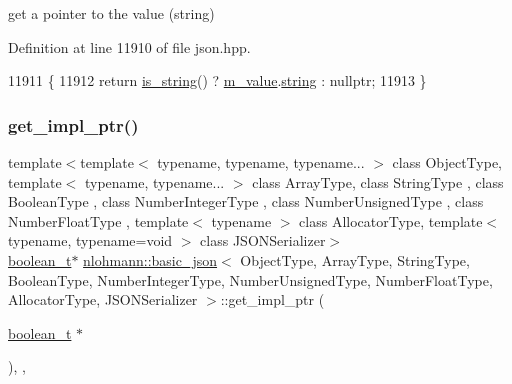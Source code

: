 get a pointer to the value (string) 



Definition at line 11910 of file json.\+hpp.


\begin{DoxyCode}
11911     \{
11912         \textcolor{keywordflow}{return} \hyperlink{classnlohmann_1_1basic__json_a69b596a4a6683b362095c9a139637396}{is\_string}() ? \hyperlink{classnlohmann_1_1basic__json_aeb0814f76966f99290cb29e127c90a77}{m\_value}.\hyperlink{unionnlohmann_1_1basic__json_1_1json__value_a9856fb4271b50d738e14c5a9a2f05118}{string} : \textcolor{keyword}{nullptr};
11913     \}
\end{DoxyCode}
\mbox{\label{classnlohmann_1_1basic__json_ab1678fb6723faf020a15300c4f6b98f5}} 
\subsubsection{\texorpdfstring{get\+\_\+impl\+\_\+ptr()}{get\_impl\_ptr()}\hspace{0.1cm}{\footnotesize\ttfamily [7/14]}}
{\footnotesize\ttfamily template$<$template$<$ typename, typename, typename... $>$ class Object\+Type, template$<$ typename, typename... $>$ class Array\+Type, class String\+Type , class Boolean\+Type , class Number\+Integer\+Type , class Number\+Unsigned\+Type , class Number\+Float\+Type , template$<$ typename $>$ class Allocator\+Type, template$<$ typename, typename=void $>$ class J\+S\+O\+N\+Serializer$>$ \\
\hyperlink{classnlohmann_1_1basic__json_a4c919102a9b4fe0d588af64801436082}{boolean\+\_\+t}$\ast$ \hyperlink{classnlohmann_1_1basic__json}{nlohmann\+::basic\+\_\+json}$<$ Object\+Type, Array\+Type, String\+Type, Boolean\+Type, Number\+Integer\+Type, Number\+Unsigned\+Type, Number\+Float\+Type, Allocator\+Type, J\+S\+O\+N\+Serializer $>$\+::get\+\_\+impl\+\_\+ptr (\begin{DoxyParamCaption}\item[{\hyperlink{classnlohmann_1_1basic__json_a4c919102a9b4fe0d588af64801436082}{boolean\+\_\+t} $\ast$}]{ }\end{DoxyParamCaption})\hspace{0.3cm}{\ttfamily [inline]}, {\ttfamily [private]}, {\ttfamily [noexcept]}}



